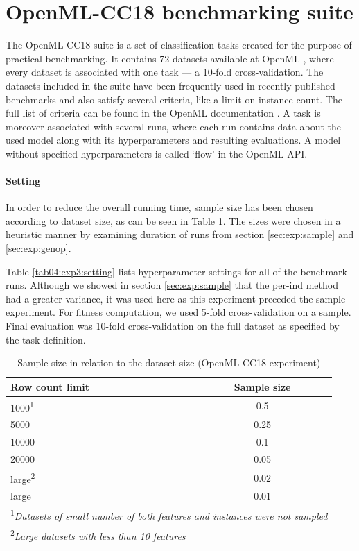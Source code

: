 \section{OpenML-CC18 benchmarking suite}
The OpenML-CC18 suite is a set of classification tasks created for the purpose
of practical benchmarking. It contains 72 datasets available at OpenML
\citep{openmlcc18}, where
every dataset is associated with one task --- a 10-fold cross-validation. The
datasets included in the suite have been frequently used in recently published
benchmarks and also satisfy several criteria, like a limit on instance count.
The full list of criteria can be found in the OpenML documentation
\citep{openmlcc18docs}. A task is moreover associated with several runs, where
each run contains data about the used model along with its hyperparameters and
resulting evaluations. A model without specified hyperparameters is called
`flow' in the OpenML API.

\paragraph{Setting}
In order to reduce the overall running time, sample size has been chosen
according to dataset size, as can be seen in Table \ref{tab04:exp3:size}.
The sizes were chosen in a heuristic manner by examining duration of runs
from section \ref{sec:exp:sample} and \ref{sec:exp:genop}.

Table \ref{tab04:exp3:setting} lists hyperparameter settings for all of the
benchmark runs. Although we showed in section \ref{sec:exp:sample}
that the per-ind method had a greater variance, it was used here as this
experiment preceded the sample experiment. For fitness computation, we used
5-fold cross-validation on a sample. Final evaluation was 10-fold
cross-validation on the full dataset as specified by the task definition.

\begin{table}[b]

\centering
\caption{Sample size in relation to the dataset size (OpenML-CC18 experiment)}\label{tab04:exp3:size}
\begin{tabular}{l c}
\toprule
\textbf{Row count limit} & \textbf{Sample size} \\
\midrule
1000\textsuperscript{1} & 0.5 \\
5000 & 0.25 \\
10000 & 0.1 \\
20000 & 0.05 \\
large\textsuperscript{2} & 0.02 \\
large & 0.01 \\
\bottomrule

\multicolumn{2}{l}{\footnotesize
\textsuperscript{1}\textit{Datasets of small number of both features and
instances were not sampled}} \\
\multicolumn{2}{l}{\footnotesize
\textsuperscript{2}\textit{Large datasets with less than 10 features}} 

\end{tabular}

\end{table}

